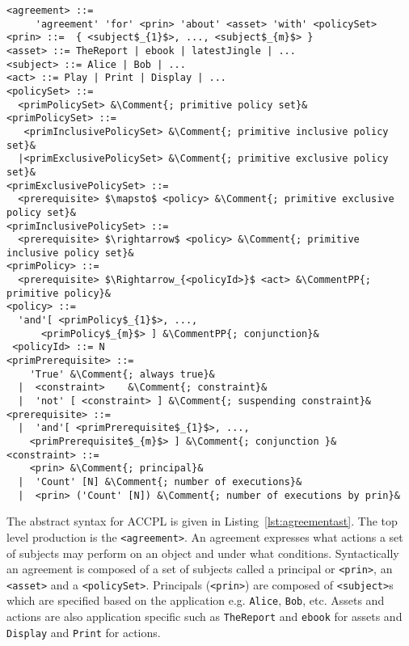 \documentclass[runningheads,a4paper]{llncs}
\newcommand{\syn}{\texttt}
\begin{document}
\newcommand*{\Comment}[1]{\hfill\makebox[5.0cm][l]{#1}}%
\newcommand*{\CommentPP}[1]{\hfill\makebox[3.0cm][l]{#1}}%
\lstset{mathescape, language=AST, escapechar=\&} 
\begin{minipage}[c]{0.95\textwidth}
\begin{lstlisting}[frame=single, caption={Abstract Syntax for ACCPL},label={lst:agreementast}]
<agreement> ::= 
     'agreement' 'for' <prin> 'about' <asset> 'with' <policySet> 
<prin> ::=  { <subject$_{1}$>, ..., <subject$_{m}$> }
<asset> ::= TheReport | ebook | latestJingle | ...
<subject> ::= Alice | Bob | ...
<act> ::= Play | Print | Display | ...
<policySet> ::=  
  <primPolicySet> &\Comment{; primitive policy set}&
<primPolicySet> ::=  
   <primInclusivePolicySet> &\Comment{; primitive inclusive policy set}&
  |<primExclusivePolicySet> &\Comment{; primitive exclusive policy set}&
<primExclusivePolicySet> ::=  
  <prerequisite> $\mapsto$ <policy> &\Comment{; primitive exclusive policy set}&
<primInclusivePolicySet> ::=  
  <prerequisite> $\rightarrow$ <policy> &\Comment{; primitive inclusive policy set}&
<primPolicy> ::=  
  <prerequisite> $\Rightarrow_{<policyId>}$ <act> &\CommentPP{; primitive policy}&
<policy> ::=  
  'and'[ <primPolicy$_{1}$>, ..., 
      <primPolicy$_{m}$> ] &\CommentPP{; conjunction}&
 <policyId> ::= N 
<primPrerequisite> ::=  
    'True' &\Comment{; always true}&
  |  <constraint>	 &\Comment{; constraint}&
  |  'not' [ <constraint> ] &\Comment{; suspending constraint}&    
<prerequisite> ::=    
  |  'and'[ <primPrerequisite$_{1}$>, ..., 
    <primPrerequisite$_{m}$> ] &\Comment{; conjunction }&
<constraint> ::=  
    <prin> &\Comment{; principal}&
  |  'Count' [N] &\Comment{; number of executions}&
  |  <prin> ('Count' [N]) &\Comment{; number of executions by prin}&     
\end{lstlisting}
\end{minipage} 

The abstract syntax for \ac{ACCPL} is given in Listing~\ref{lst:agreementast}. The top level production is the \syn{<agreement>}. An agreement expresses what actions a set of subjects may perform on an object and under what conditions. Syntactically an agreement is composed of a set of subjects called a principal or \syn{<prin>}, an \syn{<asset>} and a \syn{<policySet>}. Principals (\syn{<prin>}) are composed of \syn{<subject>}s which are specified based on the application e.g. \syn{Alice}, \syn{Bob}, etc. Assets and actions are also application specific such as \syn{TheReport} and \syn{ebook} for assets and \syn{Display} and \syn{Print} for actions. 
\end{document}
